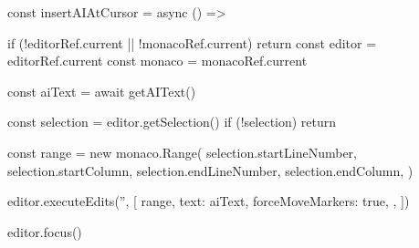 const insertAIAtCursor = async () => {
  if (!editorRef.current || !monacoRef.current) return
  const editor = editorRef.current
  const monaco = monacoRef.current

  const aiText = await getAIText()

  const selection = editor.getSelection()
  if (!selection) return

  const range = new monaco.Range(
    selection.startLineNumber,
    selection.startColumn,
    selection.endLineNumber,
    selection.endColumn,
  )

  editor.executeEdits('', [
    {
      range,
      text: aiText,
      forceMoveMarkers: true,
    },
  ])

  editor.focus()
}
